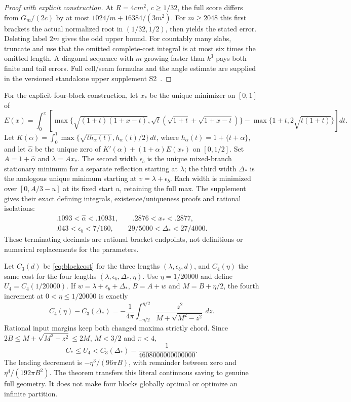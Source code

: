 \documentclass[11pt,letterpaper]{article}
\theoremstyle{definition}\newtheorem{definition}[theorem]{Definition}
\theoremstyle{remark}\newtheorem{remark}[theorem]{Remark}
\newcommand{\CC}{C_\ast}
\begin{document}
\begin{proof}[Proof with explicit construction]
At $R=4cm^2$, $c\ge1/32$, the full score differs from $G_m/(2c)$ by
at most $1024/m+16384/(3m^2)$. For $m\ge2048$ this first brackets
the actual normalized root in $(1/32,1/2)$, then yields the stated error.
Deleting label $2m$ gives the odd upper bound. For countably many slabs,
truncate and use that the omitted complete-cost integral is at most six
times the omitted length. A diagonal sequence with $m$ growing faster
than $k^3$ pays both finite and tail errors. Full cell/seam formulas and
the angle estimate are supplied in the versioned standalone upper supplement S2~\cite{upper}.
\end{proof}

For the explicit four-block construction, let $x_*$ be the unique minimizer
on $[0,1]$ of
\[
 E(x)=\int_0^x\!\left[
 \max\{\sqrt{(1+t)(1+x-t)},\sqrt t(\sqrt{1+t}+\sqrt{1+x-t})\}
 -\max\{1+t,2\sqrt{t(1+t)}\}\right]dt.
\]
Let $K(\alpha)=\int_0^1\max\{\sqrt{t h_\alpha(t)},h_\alpha(t)/2\}\,dt$,
where $h_\alpha(t)=1+\{t+\alpha\}$, and let $\widehat\alpha$ be the
unique zero of $K'(\alpha)+(1+\alpha)E(x_*)$ on $[0,1/2]$.
Set $A=1+\widehat\alpha$ and $\lambda=Ax_*$.
The second width $\epsilon_b$ is the unique mixed-branch stationary
minimum for a separate reflection starting at $\lambda$; the third width
$\Delta_*$ is the analogous unique minimum starting at
$v=\lambda+\epsilon_b$. Each width is minimized over
$[0,A/3-u]$ at its fixed start $u$, retaining the full max.
The supplement \cite{upper} gives their exact defining integrals,
existence/uniqueness proofs and rational isolations:
\[
\begin{gathered}
 .1093<\widehat\alpha<.10931,\qquad .2876<x_*<.2877,\\
 .043<\epsilon_b<7/160,\qquad 29/5000<\Delta_*<27/4000.
\end{gathered}
\]
These terminating decimals are rational bracket endpoints, not definitions
or numerical replacements for the parameters.

Let $C_3(d)$ be \eqref{eq:blockcost} for the three lengths
$(\lambda,\epsilon_b,d)$, and $C_4(\eta)$ the same cost for the four
lengths $(\lambda,\epsilon_b,\Delta_*,\eta)$.
Use $\eta=1/20000$ and define $U_4=C_4(1/20000)$.
If $w=\lambda+\epsilon_b+\Delta_*$, $B=A+w$ and
$M=B+\eta/2$, the fourth increment at $0<\eta\le1/20000$ is exactly
\[
 C_4(\eta)-C_3(\Delta_*)=
 -\frac1{4\pi}\int_{-\eta/2}^{\eta/2}
       \frac{z^2}{M+\sqrt{M^2-z^2}}\,dz.
\]
Rational input margins keep both changed maxima strictly chord.
Since $2B\le M+\sqrt{M^2-z^2}\le2M$, $M<3/2$ and $\pi<4$,
\begin{equation}\label{eq:U4}
 \CC\le U_4<C_3(\Delta_*)-\frac1{4608000000000000}.
\end{equation}
The leading decrement is $-\eta^3/(96\pi B)$, with remainder between
zero and $\eta^4/(192\pi B^2)$. The theorem transfers this literal
continuous saving to genuine full geometry. It does not make four blocks
globally optimal or optimize an infinite partition.
\end{document}
